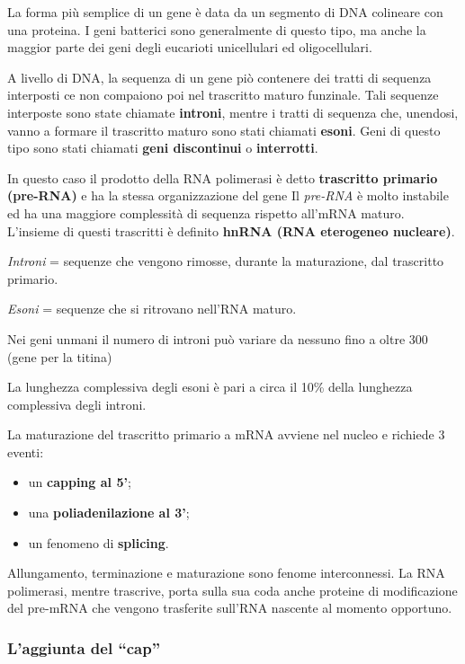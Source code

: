 \documentclass[]{article}
\begin{document}
La forma più semplice di un gene è data da un segmento di DNA colineare
con una proteina. I geni batterici sono generalmente di questo tipo, ma
anche la maggior parte dei geni degli eucarioti unicellulari ed
oligocellulari.

A livello di DNA, la sequenza di un gene piò contenere dei tratti di
sequenza interposti ce non compaiono poi nel trascritto maturo
funzinale. Tali sequenze interposte sono state chiamate
\textbf{introni}, mentre i tratti di sequenza che, unendosi, vanno a
formare il trascritto maturo sono stati chiamati \textbf{esoni}. Geni di
questo tipo sono stati chiamati \textbf{geni discontinui} o
\textbf{interrotti}.

In questo caso il prodotto della RNA polimerasi è detto
\textbf{trascritto primario (pre-RNA)} e ha la stessa organizzazione del
gene Il \emph{pre-RNA} è molto instabile ed ha una maggiore complessità
di sequenza rispetto all'mRNA maturo. L'insieme di questi trascritti è
definito \textbf{hnRNA (RNA eterogeneo nucleare)}.

\emph{Introni} = sequenze che vengono rimosse, durante la maturazione,
dal trascritto primario.

\emph{Esoni} = sequenze che si ritrovano nell'RNA maturo.

Nei geni unmani il numero di introni può variare da nessuno fino a oltre
300 (gene per la titina)

La lunghezza complessiva degli esoni è pari a circa il 10\% della
lunghezza complessiva degli introni.

La maturazione del trascritto primario a mRNA avviene nel nucleo e
richiede 3 eventi:

\begin{itemize}
\itemsep1pt\parskip0pt
\item
  un \textbf{capping al 5'};
\item
  una \textbf{poliadenilazione al 3'};
\item
  un fenomeno di \textbf{splicing}.
\end{itemize}

Allungamento, terminazione e maturazione sono fenome interconnessi. La
RNA polimerasi, mentre trascrive, porta sulla sua coda anche proteine di
modificazione del pre-mRNA che vengono trasferite sull'RNA nascente al
momento opportuno.

\subsubsection{\texorpdfstring{L'aggiunta del
``cap''}{L'aggiunta del cap}}\label{laggiunta-del-cap}
\end{document}
